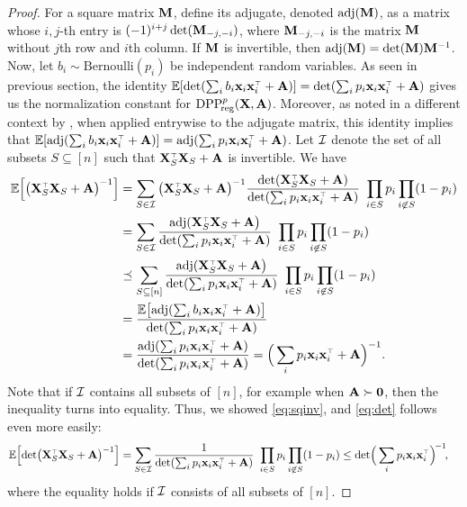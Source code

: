 \documentclass[../../thesis.tex]{subfiles}
\begin{document}
\begin{proof}
  For a square matrix $\mathbf M$, define its adjugate, denoted $\operatorname{\textnormal{adj}}(\mathbf M)$, as a matrix
  whose $i,j$-th entry is $(-1)^{i+j}\det(\mathbf M_{-j,-i})$, where
  $\mathbf M_{-j,-i}$ is the matrix $\mathbf M$ without $j$th row and $i$th column. If
  $\mathbf M$ is invertible, then $\operatorname{\textnormal{adj}}(\mathbf M) = \det(\mathbf M)\mathbf M^{-1}$. Now, let
  $b_i\sim\mathrm{Bernoulli}(p_i)$ be independent random variables. As seen
  in previous section, the identity
  $\E[\det(\sum_ib_i\x_i\x_i^\top+\A)]=\det(\sum_ip_i\x_i\x_i^\top+\A)$ gives
  us the normalization constant for ${{\mathrm{DPP}}_{\!\mathrm{reg}}^{p}}(\mathbf X,\mathbf A)$. Moreover, as
  noted in a different context by \cite{determinantal-averaging}, when
  applied entrywise to the adjugate matrix, this identity implies that
  $\E[\adj(\sum_ib_i\x_i\x_i^\top+\A)]=\adj(\sum_ip_i\x_i\x_i^\top+\A)$. Let
  $\mathcal I$ denote the set of all subsets $S\subseteq [n]$ such that
  $\X_S^\top\X_S+\A$ is invertible. We have
  \begin{align*}
    \E\Big[\big(\X_S^\top\X_S+\A\big)^{-1}\Big]
     & = \sum_{S\in\Ic}\big(\X_S^\top\X_S+\A\big)^{-1}
    \frac{\det(\X_S^\top\X_S+\A)}{\det(\sum_ip_i\x_i\x_i^\top+\A)}\ \prod_{i\in
      S}p_i\prod_{i\not\in S}(1-p_i)
    \\ &=\sum_{S\in\Ic}\frac{\adj(\X_S^\top\X_S+\A\big)}
    {\det(\sum_ip_i\x_i\x_i^\top+\A)}\ \prod_{i\in
      S}p_i\prod_{i\not\in S}(1-p_i)
    \\ &\preceq \sum_{S\subseteq[n]}\frac{\adj(\X_S^\top\X_S+\A\big)}
    {\det(\sum_ip_i\x_i\x_i^\top+\A)}\ \prod_{i\in
      S}p_i\prod_{i\not\in S}(1-p_i)
    \\ &=\frac{\E\big[\!\adj(\sum_i
        b_i\x_i\x_i^\top+\A)\big]}{\det(\sum_ip_i\x_i\x_i^\top+\A)}
    \\
     & =\frac{\adj(\sum_ip_i\x_i\x_i^\top+\A)}{\det(\sum_ip_i\x_i\x_i^\top+\A)}
    = \Big(\sum_ip_i\x_i\x_i^\top+\A\Big)^{-1}.
  \end{align*}
  Note that if $\mathcal I$ contains all subsets of $[n]$, for example when
  $\mathbf A\succ\mathbf 0$, then the inequality turns into equality. Thus, we
  showed \eqref{eq:sqinv}, and \eqref{eq:det} follows even more easily:
  \begin{align*}
    \E\Big[\!\det\!\big(\X_S^\top\X_S+\A\big)^{-1}\Big]
     & = \sum_{S\in\Ic}
    \frac{1}{\det(\sum_ip_i\x_i\x_i^\top+\A)}\ \prod_{i\in
      S}p_i\prod_{i\not\in S}(1-p_i)
    \leq \det\!\Big(\sum_i p_i\x_i\x_i^\top\Big)^{\!-1}\!,
  \end{align*}
  where the equality holds if $\mathcal I$ consists of all subsets of $[n]$.
\end{proof}
\end{document}
